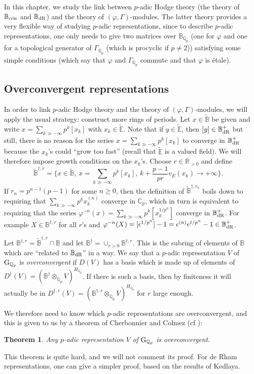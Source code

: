 \documentclass[11pt]{amsart}
\def\Q{{\mathbb Q}_p}
\def\g{{\rm G}_{\Q}}
\def\ra{\rightarrow}
\def\RR{{\mathbb R}}
\def\Cp{\mathbb{C}_p}
\def\bb{\mathbb{B}}
\def\bt{\widetilde{\mathbb{B}}}
\def\et{\widetilde{\mathbb{E}}}
\newcommand{\btdag}[1]{\widetilde{\mathbb{B}}^{\dagger #1}}
\newcommand{\bdag}[1]{\mathbb{B}^{\dagger #1}}
\def\bcris{\mathbb{B}_{\rm cris}}
\def\bdR{\mathbb{B}_{\rm dR}}
\renewcommand{\ddag}[1]{D^{\dagger #1}}
\newtheorem{thm}[definit]{\bf{Theorem}}
\begin{document}
In this chapter, we study the link between $p$-adic Hodge theory (the 
theory of $\bcris$ and $\bdR$) and the theory of 
$(\varphi,\Gamma)$-modules. The latter theory provides a very flexible 
way of studying $p$-adic representations, since to describe $p$-adic 
representations, one only needs to give two matrices over $\bb_{\Q}$ 
(one for $\varphi$ and one for a topological generator of $\Gamma_{\Q}$ 
(which is procyclic if $p \neq 2$)) satisfying some simple 
conditions (which say that $\varphi$ and $\Gamma_{\Q}$ commute and that 
$\varphi$ is \'etale).  
 
\subsection{Overconvergent representations} \label{LB41} 
In order to link $p$-adic Hodge theory  and the theory of 
$(\varphi,\Gamma)$-modules, we will apply the usual strategy: 
construct more rings of periods. Let $x \in \bt$ be given and write $x 
=\sum_{k \gg -\infty} p^k [x_k]$ with $x_k \in \et$. Note that if $y 
\in \et$, then $[y] \in \bdR^+$ but still, there is no reason for the 
series $x =\sum_{k \gg -\infty} p^k [x_k]$ to converge in $\bdR^+$ 
because the $x_k$'s could ``grow too fast'' (recall that $\et$ is
a valued field). We will  
therefore impose growth conditions on the $x_k$'s.  
Choose $r \in \RR_{> 0}$ and define 
\[ \btdag{,r} = \{ x \in \bt,\ x= \sum_{k \gg -\infty} p^k [x_k],\  
k+\frac{p-1}{pr} v_E(x_k) \ra +\infty \}. \] 
If $r_n = p^{n-1}(p-1)$ for some $n \geq 0$,  
then the definition of $\btdag{,r_n}$ boils down   
to requiring that  
$\sum_{k \gg -\infty} p^k x_k^{(n)}$ converge in $\Cp$,  
which in turn is equivalent to requiring that the series
$\varphi^{-n}(x) = \sum_{k \gg -\infty} p^k [x_k^{1/p^n}]$  
converge in $\bdR^+$. For example $X \in \bdag{,r}$ for all $r$'s and 
$\varphi^{-n}(X) = [\epsilon^{1/p^n}]-1 = \epsilon^{(n)} e^{t/p^n} -1 \in 
\bdR^+$.  
 
Let $\bdag{,r} = \btdag{,r} \cap \bb$ and let $\bdag{} = \cup_{r > 0} 
\bdag{,r}$. This is the subring of elements 
of $\bb$ which are ``related to $\bdR$'' in a way. We say that a 
$p$-adic representation $V$ of $\g$ is \emph{overconvergent} if $D(V)$ 
has a basis which is made up of elements of $\ddag{}(V)=(\bdag{} 
\otimes_{\Q} V)^{H_{\Q}}$. If there is such a basis, then by 
finiteness it will actually be in $\ddag{,r}(V)=(\bdag{,r} 
\otimes_{\Q} V)^{H_{\Q}}$ for $r$ large enough.  
 
We therefore need to know which $p$-adic representations are 
overconvergent, and this is given to us by a theorem of Cherbonnier 
and Colmez (cf \cite{CC98}):  
\begin{thm}\label{cherbcol} 
Any $p$-adic representation $V$ of $\g$ is 
overconvergent.  
\end{thm} 
This theorem is quite hard, and we will not comment 
its proof. For de Rham representations, one can give a simpler  
proof, based on the results of Kedlaya. 
 
\end{document}
